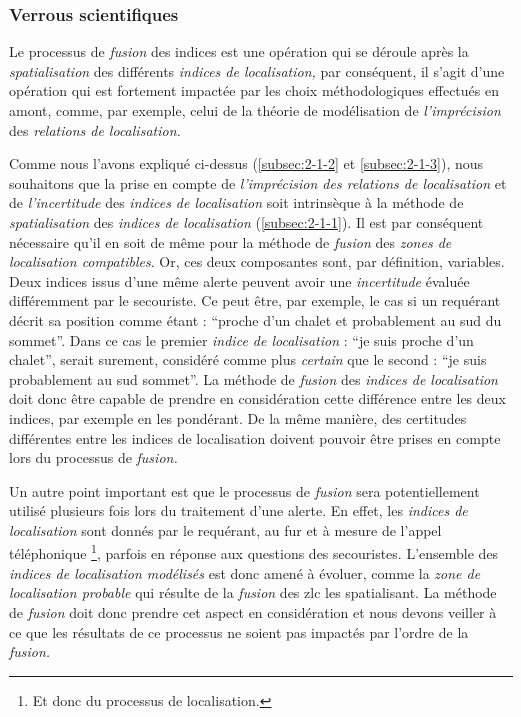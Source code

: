 \subsubsection{Verrous scientifiques}

Le processus de \emph{fusion} des indices est une opération qui se
déroule après la \emph{spatialisation} des différents \emph{indices de
  localisation,} par conséquent, il s'agit d'une opération qui est
fortement impactée par les choix méthodologiques effectués en amont,
comme, par exemple, celui de la théorie de modélisation de
\emph{l'imprécision }des \emph{relations de localisation.}

Comme nous l'avons expliqué ci-dessus (\ref{subsec:2-1-2} et
\ref{subsec:2-1-3}), nous souhaitons que la prise en compte de
\emph{l'imprécision des relations de localisation} et de
\emph{l'incertitude} des \emph{indices de localisation} soit
intrinsèque à la méthode de \emph{spatialisation} des \emph{indices de
  localisation} (\ref{subsec:2-1-1}). Il est par conséquent nécessaire
qu'il en soit de même pour la méthode de \emph{fusion} des \emph{zones
  de localisation compatibles}.
% 
Or, ces deux composantes sont, par définition, variables. Deux indices
issus d'une même alerte peuvent avoir une \emph{incertitude} évaluée
différemment par le secouriste. Ce peut être, par exemple, le cas si
un requérant décrit sa position comme étant : \enquote{proche d'un
  chalet et probablement au sud du sommet}. Dans ce cas le premier
\emph{indice de localisation} : \enquote{je suis proche d'un chalet},
serait surement, considéré comme plus \emph{certain} que le second :
\enquote{je suis probablement au sud sommet}. La méthode de
\emph{fusion} des \emph{indices de localisation} doit donc être
capable de prendre en considération cette différence entre les deux
indices, par exemple en les pondérant. De la même manière, des
certitudes différentes entre les indices de localisation doivent
pouvoir être prises en compte lors du processus de \emph{fusion.}

Un autre point important est que le processus de \emph{fusion} sera
potentiellement utilisé plusieurs fois lors du traitement d'une
alerte. En effet, les \emph{indices de localisation} sont donnés par
le requérant, au fur et à mesure de l'appel téléphonique \footnote{Et
  donc du processus de localisation.}, parfois en réponse aux
questions des secouristes. L'ensemble des \emph{indices de
  localisation modélisés} est donc amené à évoluer, comme la
\emph{zone de localisation probable} qui résulte de la \emph{fusion}
des \ac{zlc} les spatialisant.
%
La méthode de \emph{fusion} doit donc
prendre cet aspect en considération et nous devons veiller à ce que
les résultats de ce processus ne soient pas impactés par l'ordre de la
\emph{fusion.}

